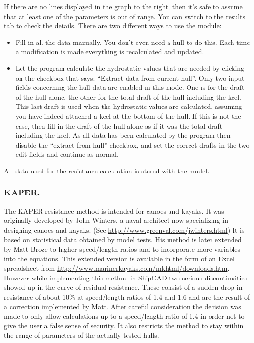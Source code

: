 \documentclass[12pt]{article}
\begin{document}
If there are no lines displayed in the graph to the right, then it's safe to assume that at least one of
the parameters is out of range. You can switch to the results tab to check the details.
There are two different ways to use the module:

\begin{itemize}

\item Fill in all the data manually. You don't even need a hull to do this. Each time a modification is
made everything is recalculated and updated.

\item Let the program calculate the hydrostatic values that are needed by clicking on the checkbox that
says: “Extract data from current hull”. Only two input fields
concerning the hull data are enabled in this mode. One is for the
draft of the hull alone, the other for the total draft of the hull
including the keel. This last draft is used when the hydrostatic
values are calculated, assuming you have indeed attached a keel at the
bottom of the hull. If this is not the case, then fill in the draft of
the hull alone as if it was the total draft including the keel. As all
data has been calculated by the program then disable the “extract from
hull” checkbox, and set the correct drafts in the two edit fields and
continue as normal.

\end{itemize}

All data used for the resistance calculation is stored with the model.

\subsubsection{KAPER.}
The KAPER resistance method is intended for canoes and kayaks. It was
originally developed by John Winters, a naval architect now
specializing in designing canoes and kayaks. (See
\url{http://www.greenval.com/jwinters.html}) It is based on statistical data obtained by model tests. His
method is later extended by Matt Broze to higher speed/length ratios
and to incorporate more variables into the equations. This extended
version is available in the form of an Excel spreadsheet
from \url{http://www.marinerkayaks.com/mkhtml/downloads.htm}. However
while implementing this method in ShipCAD two serious discontinuities
showed up in the curve of residual resistance.  These consist of a
sudden drop in resistance of about 10\% at speed/length ratios of 1.4
and 1.6 and are the result of a correction implemented by Matt. After
careful consideration the decision was made to only allow calculations
up to a speed/length ratio of 1.4 in order not to give the user a
false sense of security. It also restricts the method to stay within
the range of parameters of the actually tested hulls.
\end{document}
